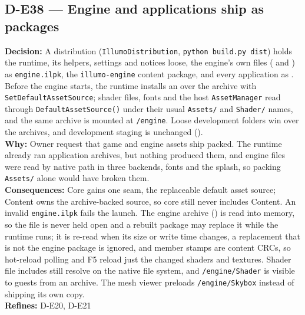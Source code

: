 \subsection*{D-E38 --- Engine and applications ship as packages}
\begin{decisionbox}[title={D-E38 \quad 2026-10-02}]
\textbf{Decision:} A distribution (\texttt{IllumoDistribution},
\texttt{python build.py dist}) holds the runtime, its helpers, settings and
notices loose, the engine's own files ( and
) as \texttt{engine.ilpk}, the \texttt{illumo-engine}
content package, and every application as . Before
the engine starts, the runtime installs an 
over the archive with \texttt{SetDefaultAssetSource}; shader files, fonts and
the host \texttt{AssetManager} read through \texttt{DefaultAssetSource()}
under their usual \texttt{Assets/} and \texttt{Shader/} names, and the same
archive is mounted at \texttt{/engine}. Loose development folders win over the
archives, and development staging is unchanged
().\\
\textbf{Why:} Owner request that game and engine assets ship packed. The
runtime already ran application archives, but nothing produced them, and
engine files were read by native path in three backends, fonts and the
splash, so packing \texttt{Assets/} alone would have broken them.\\
\textbf{Consequences:} Core gains one seam, the replaceable default asset
source; Content owns the archive-backed source, so core still never includes
Content. An invalid \texttt{engine.ilpk} fails the launch. The engine archive
() is read into memory, so the file is never
held open and a rebuilt package may replace it while the runtime runs; it is
re-read when its size or write time changes, a replacement that is not the
engine package is ignored, and member stamps are content CRCs, so hot-reload
polling and F5 reload just the changed shaders and textures. Shader file
includes still resolve on the native file system, and
\texttt{/engine/Shader} is visible to guests from an archive. The mesh viewer
preloads \texttt{/engine/Skybox} instead of shipping its own copy.\\
\textbf{Refines:} D-E20, D-E21
\end{decisionbox}

